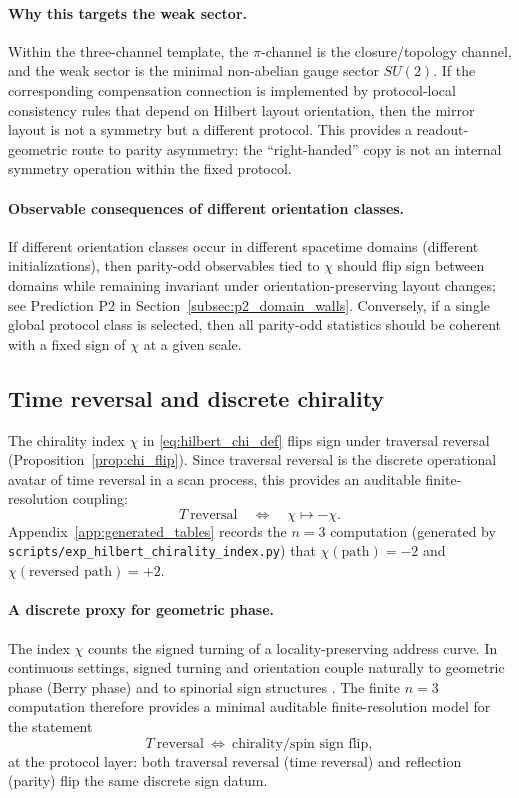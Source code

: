 \paragraph{Why this targets the weak sector.}
Within the three-channel template, the $\pi$-channel is the closure/topology channel, and the weak sector is the minimal non-abelian gauge sector $SU(2)$.
If the corresponding compensation connection is implemented by protocol-local consistency rules that depend on Hilbert layout orientation, then the mirror layout is not a symmetry but a different protocol.
This provides a readout-geometric route to parity asymmetry: the ``right-handed'' copy is not an internal symmetry operation within the fixed protocol.

\paragraph{Observable consequences of different orientation classes.}
If different orientation classes occur in different spacetime domains (different initializations), then parity-odd observables tied to $\chi$ should flip sign between domains while remaining invariant under orientation-preserving layout changes; see Prediction P2 in Section~\ref{subsec:p2_domain_walls}.
Conversely, if a single global protocol class is selected, then all parity-odd statistics should be coherent with a fixed sign of $\chi$ at a given scale.

\subsection{Time reversal and discrete chirality}
\label{subsec:time_reversal_chi}

The chirality index $\chi$ in \eqref{eq:hilbert_chi_def} flips sign under traversal reversal (Proposition~\ref{prop:chi_flip}).
Since traversal reversal is the discrete operational avatar of time reversal in a scan process, this provides an auditable finite-resolution coupling:
\[
T\ \text{reversal} \quad\Longleftrightarrow\quad \chi\mapsto -\chi.
\]
Appendix~\ref{app:generated_tables} records the $n=3$ computation (generated by \texttt{scripts/exp\_hilbert\_chirality\_index.py}) that $\chi(\text{path})=-2$ and $\chi(\text{reversed path})=+2$.

\paragraph{A discrete proxy for geometric phase.}
The index $\chi$ counts the signed turning of a locality-preserving address curve.
In continuous settings, signed turning and orientation couple naturally to geometric phase (Berry phase) and to spinorial sign structures \cite{Berry1984,Nakahara2003}.
The finite $n=3$ computation therefore provides a minimal auditable finite-resolution model for the statement
\[
T\ \text{reversal}\ \Longleftrightarrow\ \text{chirality/spin sign flip},
\]
at the protocol layer: both traversal reversal (time reversal) and reflection (parity) flip the same discrete sign datum.

